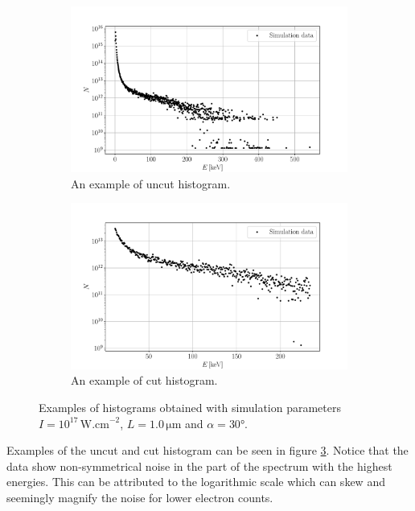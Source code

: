 \begin{figure}[h]
	\centering
		\begin{subfigure}{0.49\textwidth}
		\centering
		\includegraphics[width=\textwidth]{figures/untrimmed-hist}
		\caption{An example of uncut histogram.}
		\label{fig:ex-uncut}
	\end{subfigure}
	\hfill
	\begin{subfigure}{0.49\textwidth}
		\centering
		\includegraphics[width=\textwidth]{figures/trimmed-hist}
		\caption{An example of cut histogram.}
		\label{fig:ex-cut}
	\end{subfigure}
	\caption{Examples of histograms obtained with simulation parameters $I=10^{17}\,\mathrm{W.cm}^{-2}$, $L=1.0\,\mathrm{\mu m}$ and $\alpha = 30$°.}
	\label{fig:trimmed-hist}
\end{figure}

Examples of the uncut and cut histogram can be seen in figure \ref{fig:trimmed-hist}. Notice that the data show non-symmetrical noise in the part of the spectrum with the highest energies. This can be attributed to the logarithmic scale which can skew and seemingly magnify the noise for lower electron counts. 

